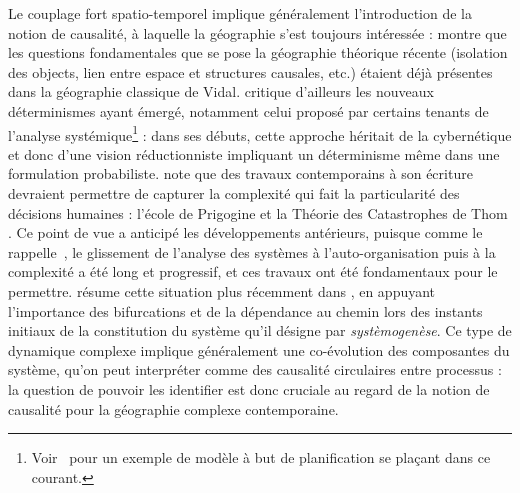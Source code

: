 {Le couplage fort spatio-temporel implique généralement l'introduction de la notion de causalité, à laquelle la géographie s'est toujours intéressée : \cite{loi1985etude} montre que les questions fondamentales que se pose la géographie théorique récente (isolation des objects, lien entre espace et structures causales, etc.) étaient déjà présentes dans la géographie classique de Vidal. \cite{claval1985causalite} critique d'ailleurs les nouveaux déterminismes ayant émergé, notamment celui proposé par certains tenants de l'analyse systémique\footnote{Voir~\cite{chamussy1984dynamique} pour un exemple de modèle à but de planification se plaçant dans ce courant.} : dans ses débuts, cette approche héritait de la cybernétique et donc d'une vision réductionniste impliquant un déterminisme même dans une formulation probabiliste.  note que des travaux contemporains à son écriture devraient permettre de capturer la complexité qui fait la particularité des décisions humaines : l'école de Prigogine et la Théorie des Catastrophes de Thom . Ce point de vue a anticipé les développements antérieurs, puisque comme le rappelle~\cite{pumain2003approche}, le glissement de l'analyse des systèmes à l'auto-organisation puis à la complexité a été long et progressif, et ces travaux ont été fondamentaux pour le permettre.  résume cette situation plus récemment dans \cite{durand2003geographes}, en appuyant l'importance des bifurcations et de la dépendance au chemin lors des instants initiaux de la constitution du système qu'il désigne par \emph{systèmogenèse}. %
Ce type de dynamique complexe implique généralement une co-évolution des composantes du système, qu'on peut interpréter comme des causalité circulaires entre processus : la question de pouvoir les identifier est donc cruciale au regard de la notion de causalité pour la géographie complexe contemporaine. 
}


